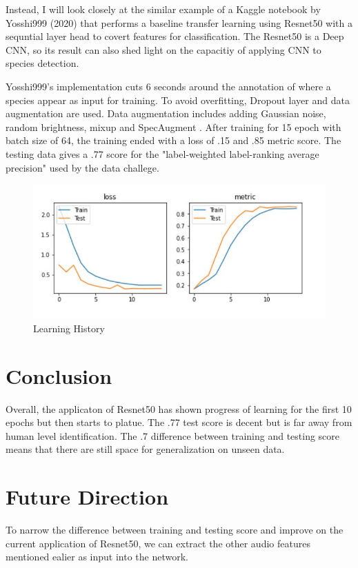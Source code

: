 \documentclass[12pt]{article}
\begin{document}
Instead, I will look closely at the similar example of a Kaggle notebook by Yosshi999 (2020) that performs a baseline transfer learning using Resnet50 \cite{resnet50TPU} with a sequntial layer head to covert features for classification. The Resnet50 is a Deep CNN, so its result can also shed light on the capacitiy of applying CNN to species detection. 

Yosshi999's implementation cuts 6 seconds around the annotation of where a species appear as input for training. To avoid overfitting, Dropout layer and data augmentation are used. Data augmentation includes adding Gaussian noise, random brightness, mixup \cite{Mixup} and SpecAugment \cite{SpecAugment}. After training for 15 epoch with batch size of 64, the training ended with a loss of  .15 and .85 metric score.  The testing data gives a .77 score for the "label-weighted label-ranking average precision" used by the data challege. 

\begin{figure}[h!]
    \includegraphics[center]{learnCurve.JPG}
    \caption{Learning History}
    \label{fig:learningCurve}
\end{figure}

\newpage

\section{Conclusion}
Overall, the applicaton of Resnet50 has shown progress of learning for the first 10 epochs but then starts to platue. The .77 test score is decent but is far away from human level identification. The .7 difference between training and testing score means that there are still space for generalization on unseen data. 

\section{Future Direction}
To narrow the difference between training and testing score and improve on the current application of Resnet50, we can extract the other audio features mentioned ealier as input into the network. 
\end{document}
